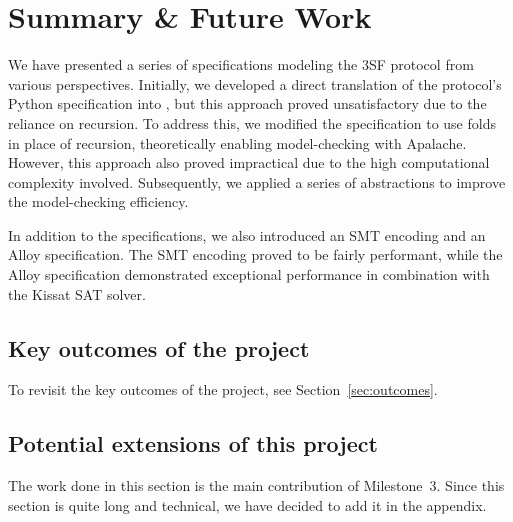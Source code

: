 \documentclass[12pt]{article}
\begin{document}
\section{Summary \& Future Work}\label{sec:summary}
We have presented a series of specifications modeling the 3SF protocol from
various perspectives. Initially, we developed a direct translation of the
protocol's Python specification into \tlap{}, but this approach proved
unsatisfactory due to the reliance on recursion. To address this, we modified
the specification to use folds in place of recursion, theoretically enabling
model-checking with Apalache. However, this approach also proved impractical
due to the high computational complexity involved. Subsequently, we applied a
series of abstractions to improve the model-checking efficiency.

In addition to the \tlap{} specifications, we also introduced an SMT encoding
and an Alloy specification. The SMT encoding proved to be fairly performant,
while the Alloy specification demonstrated exceptional performance in
combination with the Kissat SAT solver.

\subsection{Key outcomes of the project}

To revisit the key outcomes of the project, see Section~\ref{sec:outcomes}.

\subsection{Potential extensions of this project}\label{sec:future}






\pagebreak

\appendix

The work done in this section is the main contribution of Milestone~3. Since
this section is quite long and technical, we have decided to add it in the
appendix.




\end{document}
